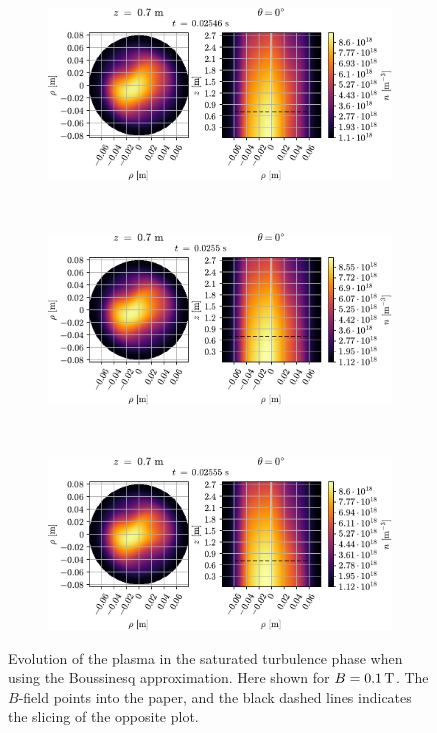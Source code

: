 {
\clearpage
\thispagestyle{empty}
\begin{figure}[htbp]
    \centering
    \begin{subfigure}[h]{1.00\textwidth}
        \centering
        \includegraphics{fig/results/compareBouss/evolution/n-perpPar-2D-0}
    \end{subfigure}%
    \\
    \begin{subfigure}[h]{1.00\textwidth}
        \centering
        \includegraphics{fig/results/compareBouss/evolution/n-perpPar-2D-1}
    \end{subfigure}
    \\
    \begin{subfigure}[h]{1.00\textwidth}
        \centering
        \includegraphics{fig/results/compareBouss/evolution/n-perpPar-2D-2}
    \end{subfigure}
    \caption{Evolution of the plasma in the saturated turbulence phase when using the Boussinesq approximation.
        Here shown for $B=0.1\, \text{T}$.
        The $B$-field points into the paper, and the black dashed lines indicates the slicing of the opposite plot.
    }
    \label{fig:turbBEv}
\end{figure}
\clearpage
}
%

